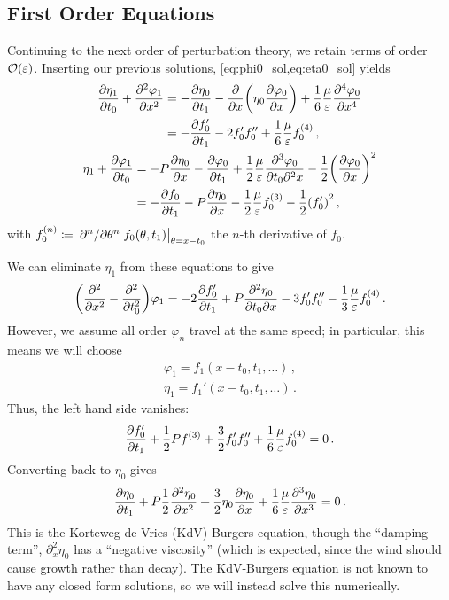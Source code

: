 \documentclass{jfm}
\renewcommand*{\epsilon}{\varepsilon}
\begin{document}
\subsection{\label{sec:int_first_order} First Order Equations}
Continuing to the next order of perturbation theory, we retain terms of
order $\order{\epsilon}$.
Inserting our previous solutions, \cref{eq:phi0_sol,eq:eta0_sol} yields
\begin{gather}
  \begin{aligned}
    \pdv{\eta_1}{t_0} + \pdv[2]{\varphi_{1}}{x} &=
      -\pdv{\eta_0}{t_1} - \pdv{x} \pqty{\eta_0 \pdv{\varphi_0}{x}} +
      \frac{1}{6} \frac{\mu}{\epsilon} \pdv[4]{\varphi_0}{x} \\
      &= -\pdv{f_0'}{t_1} - 2 f_0' f_0'' + \frac{1}{6}
      \frac{\mu}{\epsilon} f_0^{(4)} \,,
  \end{aligned}
  \\
  \begin{aligned}
    \eta_1 + \pdv{\varphi_1}{t_0} &= -P \pdv{\eta_0}{x} -\pdv{\varphi_0}{t_1}
      + \frac{1}{2} \frac{\mu}{\epsilon} \frac{\partial^3 \varphi_0}
        {\partial t_0 \partial^2 x}
      - \frac{1}{2} \pqty{ \pdv{\varphi_0}{x} }^2 \\
    &= -\pdv{f_0}{t_1} - P \pdv{\eta_0}{x} - \frac{1}{2} \frac{\mu}{\epsilon}
      f_0^{(3)} - \frac{1}{2} \pqty{f_0'}^2 \,,
  \end{aligned}
\end{gather}
with $f_0^{(n)} \coloneqq \eval{\pdv*[n]{\theta}
f_0(\theta,t_1)}_{\theta=x-t_0}$ the $n$-th derivative of $f_0$.

We can eliminate $\eta_1$ from these equations to give
\begin{equation}
  \pqty{\pdv[2]{x} - \pdv[2]{t_0}} \varphi_1 = -2 \pdv{f_0'}{t_1} +
    P\pdv{\eta_0}{t_0}{x} - 3 f_0' f_0'' - \frac{1}{3} \frac{\mu}{\epsilon}
    f_0^{(4)} \,.
\end{equation}
However, we assume all order $\varphi_{n}$ travel at the same speed; in
particular, this means we will choose
\begin{align}
  \varphi_1 = f_1(x-t_0,t_1,\ldots) \,, \label{eq:phi1_sol} \\
  \eta_1 = f_1'(x-t_0,t_1,\ldots) \,. \label{eq:eta1_sol}
\end{align}
Thus, the left hand side vanishes:
\begin{equation}
  \pdv{f_0'}{t_1} + \frac{1}{2} P f^{(3)} + \frac{3}{2} f_0' f_0''
    + \frac{1}{6} \frac{\mu}{\epsilon} f_0^{(4)} = 0\,.
\end{equation}
Converting back to $\eta_0$ gives
\begin{equation}
  \pdv{\eta_0}{t_1} + P \frac{1}{2} \pdv[2]{\eta_0}{x} + \frac{3}{2}
    \eta_0 \pdv{\eta_0}{x} + \frac{1}{6} \frac{\mu}{\epsilon}
    \pdv[3]{\eta_0}{x} = 0 \,.
  \label{eq:kdv_burgers}
\end{equation}
This is the Korteweg-de Vries (KdV)-Burgers equation, though the
``damping term'', $\partial^2_x \eta_0$ has a ``negative viscosity''
(which is expected, since the wind should cause growth rather than
decay).
The KdV-Burgers equation is not known to have any closed form solutions,
so we will instead solve this numerically.
\end{document}
